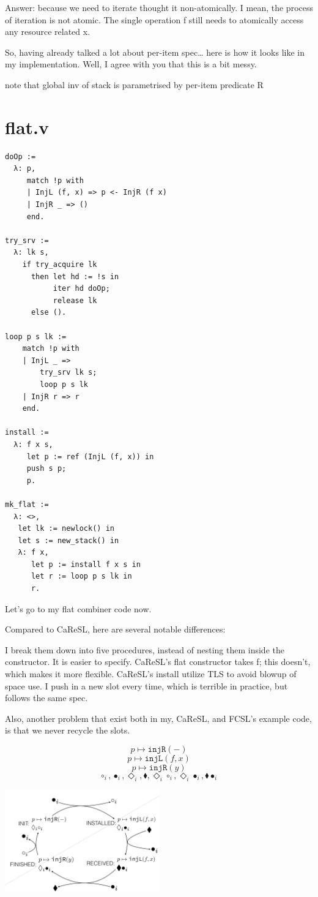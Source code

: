\documentclass[10pt]{article}
\newcommand{\bdia}{\blacklozenge}
\newcommand{\dia}{\Diamond}
\newcommand{\injR}{\texttt{injR}}
\begin{document}
Answer: because we need to iterate thought it non-atomically. I mean, the process of iteration is not atomic. The single operation f still needs to atomically access any resource related x.

So, having already talked a lot about per-item spec… here is how it looks like in my implementation. Well, I agree with you that this is a bit messy. 

note that global inv of stack is parametrised by per-item predicate R

\section{flat.v}

\begin{verbatim}
doOp :=
  λ: p,
     match !p with
     | InjL (f, x) => p <- InjR (f x)
     | InjR _ => ()
     end.

try_srv :=
  λ: lk s,
    if try_acquire lk
      then let hd := !s in
           iter hd doOp;
           release lk
      else ().

loop p s lk :=
    match !p with
    | InjL _ =>
        try_srv lk s;
        loop p s lk
    | InjR r => r
    end.

install :=
  λ: f x s,
     let p := ref (InjL (f, x)) in
     push s p;
     p.

mk_flat :=
  λ: <>,
   let lk := newlock() in
   let s := new_stack() in
   λ: f x,
      let p := install f x s in
      let r := loop p s lk in
      r.
\end{verbatim}


Let’s go to my flat combiner code now.

Compared to CaReSL, here are several notable differences:

I break them down into five procedures, instead of nesting them inside the constructor. It is easier to specify.
CaReSL’s flat constructor takes f; this doesn’t, which makes it more flexible.
CaReSL’s install utilize TLS to avoid blowup of space use. I push in a new slot every time, which is terrible in practice, but follows the same spec.

Also, another problem that exist both in my, CaReSL, and FCSL’s example code, is that we never recycle the slots.

\[p \mapsto \injR(-)\]
\[p \mapsto \texttt{injL}(f, x)\]
\[p \mapsto \injR(y)\]
\[\circ_i, \bullet_i, \dia_i, \bdia, \dia_i \circ_i, \dia_i \bullet_i, \bdia \bullet_i\]


\includegraphics[width=0.5\textwidth]{helping}
\end{document}
